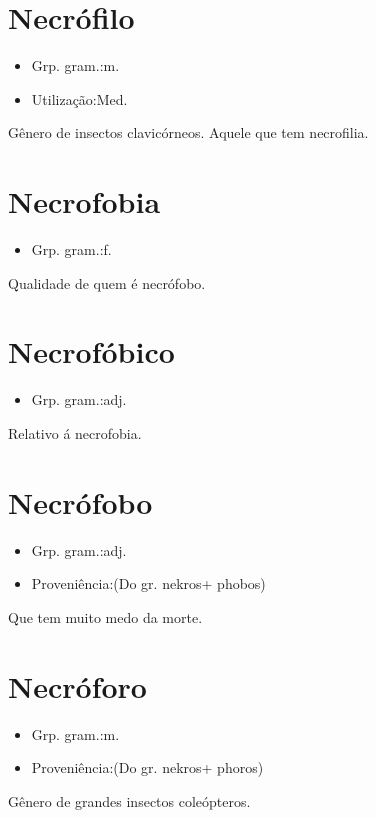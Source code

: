 \section{Necrófilo}
\begin{itemize}
\item {Grp. gram.:m.}
\end{itemize}
\begin{itemize}
\item {Utilização:Med.}
\end{itemize}
Gênero de insectos clavicórneos.
Aquele que tem necrofilia.
\section{Necrofobia}
\begin{itemize}
\item {Grp. gram.:f.}
\end{itemize}
Qualidade de quem é necrófobo.
\section{Necrofóbico}
\begin{itemize}
\item {Grp. gram.:adj.}
\end{itemize}
Relativo á necrofobia.
\section{Necrófobo}
\begin{itemize}
\item {Grp. gram.:adj.}
\end{itemize}
\begin{itemize}
\item {Proveniência:(Do gr. \textunderscore nekros\textunderscore  + \textunderscore phobos\textunderscore )}
\end{itemize}
Que tem muito medo da morte.
\section{Necróforo}
\begin{itemize}
\item {Grp. gram.:m.}
\end{itemize}
\begin{itemize}
\item {Proveniência:(Do gr. \textunderscore nekros\textunderscore  + \textunderscore phoros\textunderscore )}
\end{itemize}
Gênero de grandes insectos coleópteros.
